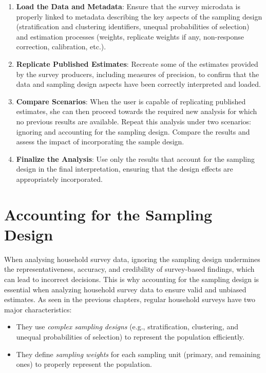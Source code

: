 \documentclass[
  12pt,
]{book}
\begin{document}
\begin{enumerate}
\def\labelenumi{\arabic{enumi}.}
\item
  \textbf{Load the Data and Metadata}: Ensure that the survey microdata is properly linked to metadata describing the key aspects of the sampling design (stratification and clustering identifiers, unequal probabilities of selection) and estimation processes (weights, replicate weights if any, non-response correction, calibration, etc.).
\item
  \textbf{Replicate Published Estimates}: Recreate some of the estimates provided by the survey producers, including measures of precision, to confirm that the data and sampling design aspects have been correctly interpreted and loaded.
\item
  \textbf{Compare Scenarios}: When the user is capable of replicating published estimates, she can then proceed towards the required new analysis for which no previous results are available. Repeat this analysis under two scenarios: ignoring and accounting for the sampling design. Compare the results and assess the impact of incorporating the sample design.
\item
  \textbf{Finalize the Analysis}: Use only the results that account for the sampling design in the final interpretation, ensuring that the design effects are appropriately incorporated.
\end{enumerate}

\hypertarget{accounting-for-the-sampling-design}{%
\chapter{Accounting for the Sampling Design}\label{accounting-for-the-sampling-design}}

When analysing household survey data, ignoring the sampling design undermines the representativeness, accuracy, and credibility of survey-based findings, which can lead to incorrect decisions. This is why accounting for the sampling design is essential when analyzing household survey data to ensure valid and unbiased estimates. As seen in the previous chapters, regular household surveys have two major characteristics:

\begin{itemize}
\item
  They use \emph{complex sampling designs} (e.g., stratification, clustering, and unequal probabilities of selection) to represent the population efficiently.
\item
  They define \emph{sampling weights} for each sampling unit (primary, and remaining ones) to properly represent the population.
\end{itemize}
\end{document}
